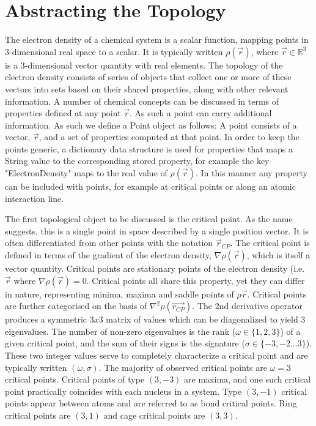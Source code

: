 \documentclass{tufte-handout}
\title{\programName{}}
\author{Matthew J L Mills}
\begin{document}
\maketitle


\begin{abstract}
\end{abstract}

\section{Abstracting the Topology}

The electron density of a chemical system is a scalar function, mapping points in 3-dimensional real space to a scalar. It is typically written $\rho(\vec{r})$, where $\vec{r}  \in \mathbb{R}^{3}$ is a 3-dimensional vector quantity with real elements. The topology of the electron density consists of series of objects that collect one or more of these vectors into sets based on their shared properties, along with other relevant information. A number of chemical concepts can be discussed in terms of properties defined at any point $\vec{r}$. As such a point can carry additional information. As such we define a Point object as follows:
A point consists of a vector, $\vec{r}$, and a set of properties computed at that point.
In order to keep the points generic, a dictionary data structure is used for properties that maps a String value to the corresponding stored property, for example the key "ElectronDensity" maps to the real value of $\rho(\vec{r})$. In this manner any property can be included with points, for example at critical points or along an atomic interaction line.
\par{}
The first topological object to be discussed is the critical point. As the name suggests, this is a single point in space described by a single position vector. It is often differentiated from other points with the notation $\vec{r}_{CP}$. The critical point is defined in terms of the gradient of the electron density, $\nabla \rho(\vec{r})$, which is itself a vector quantity. Critical points are stationary points of the electron density (i.e. $\vec{r}$ where $\nabla \rho(\vec{r})=0$. Critical points all share this property, yet they can differ in nature, representing minima, maxima and saddle points of $\rho\vec{r}$. Critical points are further categorised on the basis of $\nabla^{2} \rho(\vec{r_{CP}})$. The 2nd derivative operator produces a symmetric $3x3$ matrix of values which can be diagonalized to yield 3 eigenvalues. The number of non-zero eigenvalues is the rank ($\omega \in \{1,2,3\}$) of a given critical point, and the sum of their signs is the signature ($\sigma \in \{-3,-2...3\}$). These two integer values serve to completely characterize a critical point and are typically written $(\omega,\sigma)$. The majority of observed critical points are $\omega=3$ critical points. Critical points of type $(3,-3)$ are maxima, and one such critical point practically coincides with each nucleus in a system. Type $(3,-1)$ critical points appear between atoms and are referred to as bond critical points. Ring critical points are $(3,1)$ and cage critical points are $(3,3)$.
\end{document}
